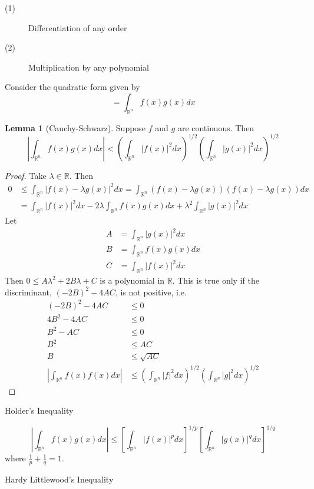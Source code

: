 \documentclass[12pt,leqno]{article}
\numberwithin{equation}{section}
\theoremstyle{definition}
\newtheorem*{Lem}{Lemma}
\begin{document}
\begin{description}
 \item [(1)] Differentiation of any order
 \item [(2)] Multiplication by any polynomial
\end{description}

Consider the quadratic form given by \[<f,g>=\int_{\mathbb{R}^n}f(x)g(x)dx\] 

\begin{Lem}[Cauchy-Schwarz]
 Suppose $f$ and $g$ are continuous. Then \[\left|\int_{\mathbb{R}^n}f(x)g(x)dx\right|<\left(\int_{\mathbb{R}^n}|f(x)|^2dx\right)^{1/2}\left(\int_{\mathbb{R}^n}|g(x)|^2dx\right)^{1/2}\]
\end{Lem}

\begin{proof}
 Take $\lambda\in\mathbb{R}$. Then \begin{align*}0&\leq\int_{\mathbb{R}^n}\left|f(x)-\lambda g(x)\right|^2dx=\int_{\mathbb{R}^n}(f(x)-\lambda g(x))(f(x)-\lambda g(x))dx\\&=\int_{\mathbb{R}^n}|f(x)|^2dx-2\lambda\int_{\mathbb{R}^n}f(x)g(x)dx+\lambda^2\int_{\mathbb{R}^n}|g(x)|^2dx\end{align*} Let \begin{align*}A&=\int_{\mathbb{R}^n}|g(x)|^2dx\\B&=\int_{\mathbb{R}^n}f(x)g(x)dx\\C&=\int_{\mathbb{R}^n}|f(x)|^2dx\end{align*} Then $0\leq A\lambda^2+2B\lambda+C$ is a polynomial in $\mathbb{R}$. This is true only if the discriminant, $(-2B)^2-4AC$, is not positive, i.e.\begin{align*}(-2B)^2-4AC&\leq0\\4B^2-4AC&\leq0\\B^2-AC&\leq0\\B^2&\leq AC\\B&\leq\sqrt{AC}\\\left|\int_{\mathbb{R}^n}f(x)f(x)dx\right|&\leq\left(\int_{\mathbb{R}^n}|f|^2dx\right)^{1/2}\left(\int_{\mathbb{R}^n}|g|^2dx\right)^{1/2}\end{align*}
\end{proof}

Holder's Inequality

\[\left|\int_{\mathbb{R}^n}f(x)g(x)dx\right|\leq\left[\int_{\mathbb{R}^n}|f(x)|^pdx\right]^{1/p}\left[\int_{\mathbb{R}^n}|g(x)|^qdx\right]^{1/q}\] where $\frac{1}{p}+\frac{1}{q}=1$.

Hardy Littlewood's Inequality
\end{document}
